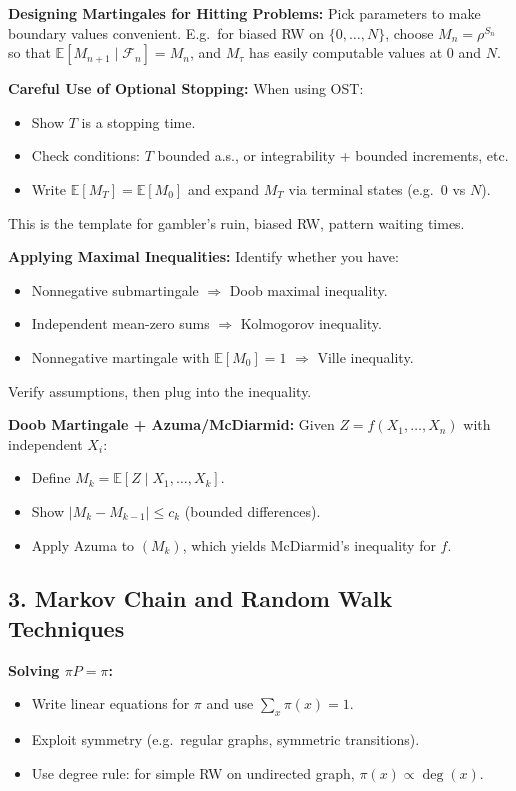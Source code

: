 \documentclass[answers,12pt,addpoints]{exam}
\begin{document}
\textbf{Designing Martingales for Hitting Problems:}
Pick parameters to make boundary values convenient.
E.g.\ for biased RW on $\{0,\dots,N\}$, choose $M_n = \rho^{S_n}$ so that $\mathbb{E}[M_{n+1}\mid\mathcal{F}_n]=M_n$, and $M_\tau$ has easily computable values at $0$ and $N$.

\textbf{Careful Use of Optional Stopping:}
When using OST:
\begin{itemize}
\item Show $T$ is a stopping time.
\item Check conditions: $T$ bounded a.s., or integrability + bounded increments, etc.
\item Write $\mathbb{E}[M_T]=\mathbb{E}[M_0]$ and expand $M_T$ via terminal states (e.g.\ $0$ vs $N$).
\end{itemize}
This is the template for gambler’s ruin, biased RW, pattern waiting times.

\textbf{Applying Maximal Inequalities:}
Identify whether you have:
\begin{itemize}
\item Nonnegative submartingale $\Rightarrow$ Doob maximal inequality.
\item Independent mean-zero sums $\Rightarrow$ Kolmogorov inequality.
\item Nonnegative martingale with $\mathbb{E}[M_0]=1$ $\Rightarrow$ Ville inequality.
\end{itemize}
Verify assumptions, then plug into the inequality.

\textbf{Doob Martingale + Azuma/McDiarmid:}
Given $Z=f(X_1,\dots,X_n)$ with independent $X_i$:
\begin{itemize}
\item Define $M_k=\mathbb{E}[Z\mid X_1,\dots,X_k]$.
\item Show $|M_k-M_{k-1}|\le c_k$ (bounded differences).
\item Apply Azuma to $(M_k)$, which yields McDiarmid’s inequality for $f$.
\end{itemize}

\subsection*{3. Markov Chain and Random Walk Techniques}

\textbf{Solving $\pi P=\pi$:}
\begin{itemize}
\item Write linear equations for $\pi$ and use $\sum_x\pi(x)=1$.
\item Exploit symmetry (e.g.\ regular graphs, symmetric transitions).
\item Use degree rule: for simple RW on undirected graph, $\pi(x)\propto \deg(x)$.
\end{itemize}
\end{document}
